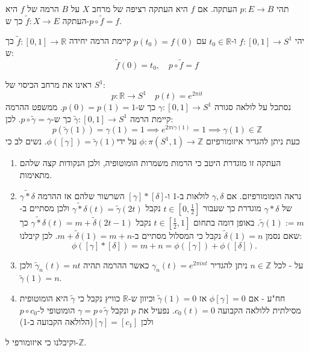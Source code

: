 \documentclass{tstextbook}
\begin{document}
\begin{definition}[הרמה]
תהי \(p:E\to B\) העתקה. אם \(f\) היא העתקה רציפה של מרחב \(X\) על \(B\) הרמה של \(f\) היא העתקה \(\tilde{f}:X\to E\) כך ש-\(p\circ\tilde{f} = f\).

\end{definition}
\begin{proposition}
יהי \(f:[0,1]\to S^{1}\) ו-\(t_{0} \in \mathbb{R}\) עם \(p(t_{0})=f(0)\) קיימת הרמה יחידה \(\tilde{f}:[0,1]\to \mathbb{R}\) כך ש:
$$\tilde{f}(0)=t_{0},\quad p\circ\tilde{f}=f$$

\end{proposition}
\begin{example}
ראינו את מרחב הכיסוי של \(S^{1}\):
$$p:\mathbb{R}\to S^{1}\quad p(t)=e^{2\pi i t}$$
נסתכל על לולאה סגורה \(\gamma:[0,1]\to S^{1}\) כך ש-\(p(0)=p(1)=1\). ממשפט ההרמה קיימת הרמה \(\tilde{\gamma}:[0,1]\to S^{1}\) כך ש-\(p\circ \tilde{\gamma}=\gamma\). לכן:
$$p\left( \tilde{\gamma}(1) \right)=\gamma(1)=1\implies e^{ 2\pi i\gamma(1) }=1\implies \gamma(1)\in \mathbb{Z}$$
כעת ניתן להגדיר איזומורפיזם \(\phi:\pi(S^{1},1)\to\mathbb{Z}\) על ידי\(\phi\left( \left[ \gamma \right] \right)=\tilde{\gamma}(1)\). נשים לב כי 

  \begin{enumerate}
    \item העתקה זו מוגדרת היטב כי הרמות משמרות הומוטופיה, ולכן הנקודות קצה שלהם מתאימות.  


    \item נראה הומומורפיזם. אם \(\gamma,\delta\) לולאות ב-1 ו-\(\left[ \gamma \right]*\left[ \delta \right]\) השרשור שלהם אז ההרמה \(\widetilde{\gamma*\delta}\) של \(\gamma * \delta\) מוגדרת כך שעבור \(t \in \left[ 0,\frac{1}{2} \right]\) נקבל \(\widetilde{\gamma*\delta}(t)=\tilde{\gamma}(2t)\) ולכן מסתיים ב-\(\tilde{\gamma}(1):= m\). באופן דומה בתחום \(t\in\left[ \frac{1}{2},1 \right]\) נקבל \(\widetilde{\gamma*\delta}(t)=m+\tilde{\delta}(2t-1)\) כך שאם נסמן \(\tilde{\delta}(1)=n\) נקבל כי המסלול מסתיים ב-\(m+\tilde{\delta}(1)=m+n\). לכן קיבלנו: 
$$\phi([\gamma]*[\delta])=m+n=\phi([\gamma])+\phi([\delta]).$$


    \item על - לכל \(n \in \mathbb{Z}\) ניתן להגדיר \(\gamma_{n}(t)=e^{ 2\pi in t }\) כאשר ההרמה תהיה \(\tilde{\gamma}_{n}(t)=nt\) ולכן \(\tilde{\gamma}(1)=n\).  


    \item חח"ע - אם \(\phi\left[ \gamma \right]=0\) אז \(\tilde{\gamma}(1)=0\) וכיוון ש-\(\mathbb{R}\) כוויץ נקבל כי \(\tilde{\gamma}\) היא הומוטופית מסילתית ללולאה הקבועה \(c_{0}(t)=0\). נפעיל את \(p\) ונקבל \(\gamma=p\circ \tilde{\gamma}\) הומוטופי ל-\(p\circ c_{0}\) ולכן \(\left[ \gamma \right]=[c_{1}]\)(הלולאה הקבועה ב-1) 


  \end{enumerate}
\end{example}
וקיבלנו כי איזומורפי ל-\(\mathbb{Z}\).
\end{document}
